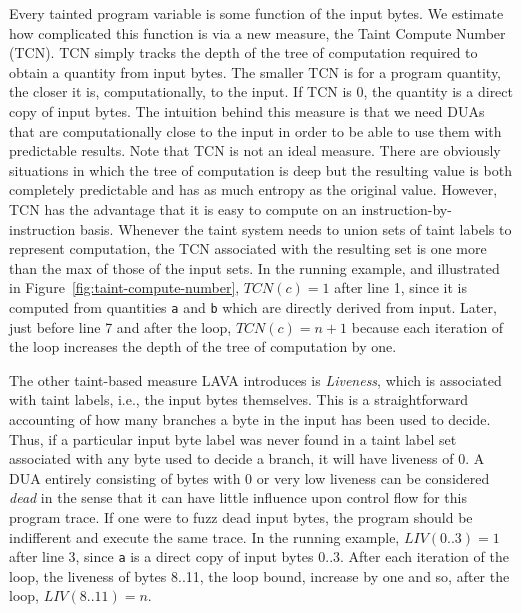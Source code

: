 \noindent
Every tainted program variable is some function of the input bytes.
We estimate how complicated this function is via a new measure, the Taint Compute Number (TCN).
TCN simply tracks the depth of the tree of computation required to obtain a quantity from input bytes.
The smaller TCN is for a program quantity, the closer it is, computationally, to the input.
If TCN is 0, the quantity is a direct copy of input bytes.
The intuition behind this measure is that we need DUAs that are computationally close to the input in order to be able to use them with predictable results.
Note that TCN is not an ideal measure.
There are obviously situations in which the tree of computation is deep but the resulting value is both completely predictable and has as much entropy as the original value.
However, TCN has the advantage that it is easy to compute on an instruction-by-instruction basis.
Whenever the taint system needs to union sets of taint labels to represent computation, the TCN associated with the resulting set is one more than the max of those of the 
input sets.
In the running example, and illustrated in Figure~\ref{fig:taint-compute-number}, $TCN(c)=1$ after line 1, since it is computed from quantities \verb+a+ and \verb+b+ which are directly derived from input.
Later, just before line 7 and after the loop, $TCN(c)=n+1$ because each iteration of the loop increases the depth of the tree of computation by one.  

The other taint-based measure LAVA introduces is \emph{Liveness}, which is associated with taint labels, i.e., the input bytes themselves.
This is a straightforward accounting of how many branches a byte in the input has been used to decide.
Thus, if a particular input byte label was never found in a taint label set associated with any byte used to decide a branch, it will have liveness of 0.
A DUA entirely consisting of bytes with 0 or very low liveness can be considered \emph{dead} in the sense that it can have little influence upon control flow for this program trace.
If one were to fuzz dead input bytes, the program should be indifferent and execute the same trace.  
In the running example, $LIV(0..3)=1$ after line 3, since \verb+a+ is a direct copy of input bytes 0..3.
After each iteration of the loop, the liveness of bytes 8..11, the loop bound, increase by one and so, after the loop, $LIV(8..11)=n$.

